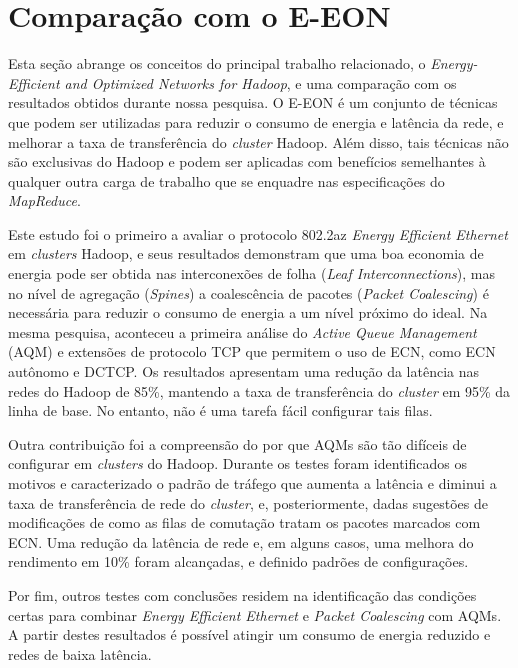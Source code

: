 \section{Comparação com o E-EON}

Esta seção abrange os conceitos do principal trabalho relacionado, o \emph{Energy-Efficient and Optimized Networks for Hadoop}, e uma comparação com os resultados obtidos durante nossa pesquisa. O E-EON \cite{silva2018eon} é um conjunto de técnicas que podem ser utilizadas para reduzir o consumo de energia e latência da rede, e melhorar a taxa de transferência do \emph{cluster} Hadoop. Além disso, tais técnicas não são exclusivas do Hadoop e podem ser aplicadas com benefícios semelhantes à qualquer outra carga de trabalho que se enquadre nas especificações do \emph{MapReduce}.

Este estudo foi o primeiro a avaliar o protocolo 802.2az \emph{Energy Efficient Ethernet} em \emph{clusters} Hadoop, e seus resultados demonstram que uma boa economia de energia pode ser obtida nas interconexões de folha (\emph{Leaf Interconnections}), mas no nível de agregação (\emph{Spines}) a coalescência de pacotes (\emph{Packet Coalescing}) é necessária para reduzir o consumo de energia a um nível próximo do ideal. Na mesma pesquisa, aconteceu a primeira análise do \emph{Active Queue Management} (AQM) e extensões de protocolo TCP que permitem o uso de ECN, como ECN autônomo e DCTCP. Os resultados apresentam uma redução da latência nas redes do Hadoop de 85\%, mantendo a taxa de transferência do \emph{cluster} em 95\% da linha de base. No entanto, não é uma tarefa fácil configurar tais filas.

Outra contribuição foi a compreensão do por que AQMs são tão difíceis de configurar em \emph{clusters} do Hadoop. Durante os testes foram identificados os motivos e caracterizado o padrão de tráfego que aumenta a latência e diminui a taxa de transferência de rede do \emph{cluster}, e, posteriormente, dadas sugestões de modificações de como as filas de comutação tratam os pacotes marcados com ECN. Uma redução da latência de rede e, em alguns casos, uma melhora do rendimento em 10\% foram alcançadas, e definido padrões de configurações.

Por fim, outros testes com conclusões residem na identificação das condições certas para combinar \emph{Energy Efficient Ethernet} e \emph{Packet Coalescing} com AQMs. A partir destes resultados é possível atingir um consumo de energia reduzido e redes de baixa latência.


